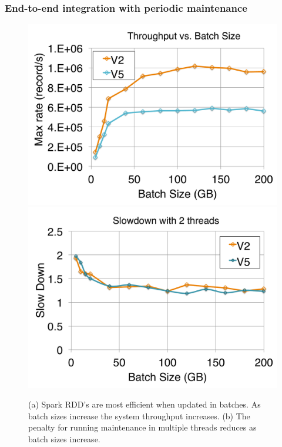 \subsubsection{End-to-end integration with periodic maintenance}
\begin{figure}[t]
\centering
 \includegraphics[scale=0.14]{exp/con_3.pdf}
 \includegraphics[scale=0.14]{exp/con_4.pdf}
 \caption{(a) Spark RDD's are most efficient when updated in batches. As batch sizes increase the system throughput increases.  (b) The penalty for running maintenance in multiple threads reduces as batch sizes increase.  \label{conv-2}}
\end{figure}


